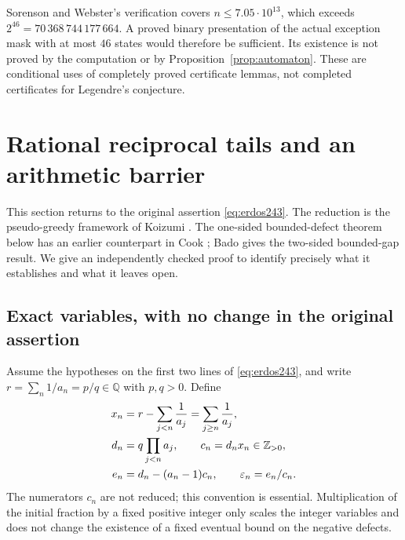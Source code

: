 \documentclass[11pt,a4paper]{article}
\theoremstyle{definition}
\theoremstyle{remark}\newtheorem{remark}[theorem]{Remark}
\newcommand{\Q}{\mathbb Q}\newcommand{\C}{\mathbb C}
\begin{document}
Sorenson and Webster's verification \cite{SW} covers
$n\le7.05\cdot10^{13}$, which exceeds
$2^{46}=70\,368\,744\,177\,664$. A proved binary presentation of
the actual exception mask with at most $46$ states would therefore
be sufficient. Its existence is not proved by the computation or
by Proposition~\ref{prop:automaton}. These are conditional uses
of completely proved certificate lemmas, not completed certificates
for Legendre's conjecture.

\section{Rational reciprocal tails and an arithmetic barrier}
\label{sec:reciprocal}

This section returns to the original assertion \eqref{eq:erdos243}.
The reduction is the pseudo-greedy framework of Koizumi \cite{Koizumi}.
The one-sided bounded-defect theorem below has an earlier counterpart
in Cook \cite{Cook}; Bado \cite{Bado} gives the two-sided bounded-gap
result. We give an independently checked proof to identify precisely
what it establishes and what it leaves open.

\subsection{Exact variables, with no change in the original assertion}

Assume the hypotheses on the first two lines of \eqref{eq:erdos243},
and write $r=\sum_n1/a_n=p/q\in\Q$ with $p,q>0$. Define
\begin{align*}
 x_n&=r-\sum_{j<n}\frac1{a_j}=\sum_{j\ge n}\frac1{a_j},\\
 d_n&=q\prod_{j<n}a_j,\qquad c_n=d_nx_n\in\mathbb Z_{>0},\\
 e_n&=d_n-(a_n-1)c_n,\qquad \varepsilon_n=e_n/c_n.
\end{align*}
The numerators $c_n$ are not reduced; this convention is essential.
Multiplication of the initial fraction by a fixed positive integer
only scales the integer variables and does not change the existence
of a fixed eventual bound on the negative defects.
\end{document}
